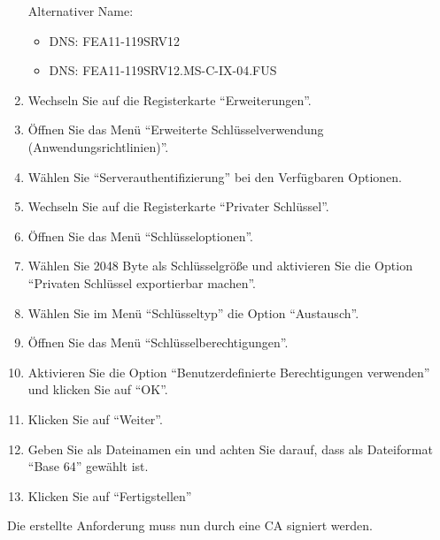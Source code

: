 \begin{enumerate}
            Alternativer Name:
            \begin{itemize}
              \item DNS: FEA11-119SRV12 
              \item DNS: FEA11-119SRV12.MS-C-IX-04.FUS
            \end{itemize}
            \item Wechseln Sie auf die Registerkarte \enquote{Erweiterungen}.
            \item Öffnen Sie das Menü \enquote{Erweiterte Schlüsselverwendung
            (Anwendungsrichtlinien)}.
\clearpage
            \item Wählen Sie \enquote{Serverauthentifizierung} bei den
            Verfügbaren Optionen.
            \item Wechseln Sie auf die Registerkarte \enquote{Privater
            Schlüssel}.
            \item Öffnen Sie das Menü \enquote{Schlüsseloptionen}.
            \item Wählen Sie 2048 Byte als Schlüsselgröße und aktivieren Sie die
            Option \enquote{Privaten Schlüssel exportierbar machen}.
            \item Wählen Sie im Menü \enquote{Schlüsseltyp} die Option
            \enquote{Austausch}.
            \item Öffnen Sie das Menü \enquote{Schlüsselberechtigungen}.
            \item Aktivieren Sie die Option \enquote{Benutzerdefinierte
            Berechtigungen verwenden} und klicken Sie auf \enquote{OK}.
            \item Klicken Sie auf \enquote{Weiter}.
            \item Geben Sie als Dateinamen  ein und achten Sie darauf, dass
            als Dateiformat \enquote{Base 64} gewählt ist.
            \item Klicken Sie auf \enquote{Fertigstellen}
          \end{enumerate}
          Die erstellte Anforderung muss nun durch eine CA signiert werden.
